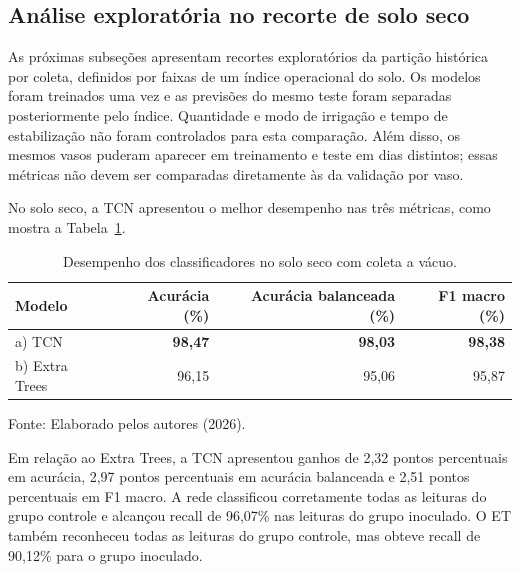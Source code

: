 \subsection{Análise exploratória no recorte de solo seco}

As próximas subseções apresentam recortes exploratórios da partição
histórica por coleta, definidos por faixas de um índice operacional do solo.
Os modelos foram treinados uma vez e as previsões do mesmo teste foram
separadas posteriormente pelo índice. Quantidade e modo de irrigação e tempo
de estabilização não foram controlados para esta comparação. Além disso, os
mesmos vasos puderam aparecer em treinamento e teste em dias distintos;
essas métricas não devem ser comparadas diretamente às da validação por vaso.

No solo seco, a TCN apresentou o melhor desempenho nas três métricas, como
mostra a Tabela~\ref{tab:resultados_solo_seco_vacuo}.

\begin{table}[htbp]
    \centering
    \caption{Desempenho dos classificadores no solo seco com coleta a vácuo.}
    \label{tab:resultados_solo_seco_vacuo}
    \begin{tabular}{lrrr}
        \hline
        \textbf{Modelo} & \textbf{Acurácia (\%)} &
        \textbf{Acurácia balanceada (\%)} & \textbf{F1 macro (\%)} \\
        \hline
        a) TCN         & \textbf{98,47} & \textbf{98,03} & \textbf{98,38} \\
        b) Extra Trees & 96,15          & 95,06          & 95,87          \\
        \hline
    \end{tabular}

    \vspace{0.1cm}
    {\footnotesize Fonte: Elaborado pelos autores (2026).}
\end{table}

Em relação ao Extra Trees, a TCN apresentou ganhos de 2,32 pontos
percentuais em acurácia, 2,97 pontos percentuais em acurácia balanceada e 2,51
pontos percentuais em F1 macro. A rede classificou corretamente todas as
leituras do grupo controle e alcançou recall de 96,07\% nas leituras do
grupo inoculado. O ET também reconheceu todas as leituras do grupo controle,
mas obteve recall de 90,12\% para o grupo inoculado.

